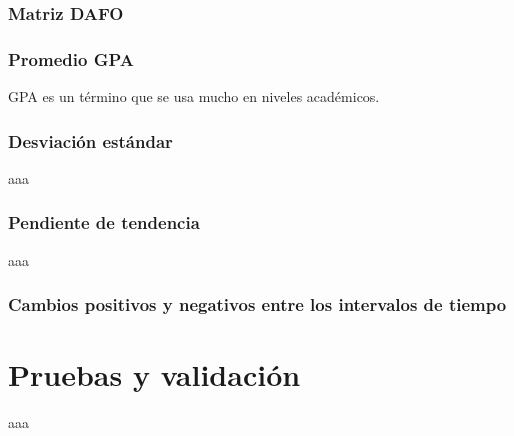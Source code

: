 \subsubsection{Matriz DAFO}
\subsubsection{Promedio GPA}
GPA es un término que se usa mucho en niveles académicos.

\subsubsection{Desviación estándar}
aaa
\subsubsection{Pendiente de tendencia}
aaa
\subsubsection{Cambios positivos y negativos entre los intervalos de tiempo}

\section{Pruebas y validación}
aaa
